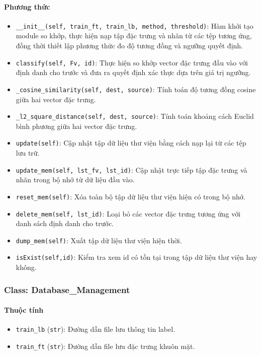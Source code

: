 \paragraph{Phương thức}
\begin{itemize}
    \item \texttt{\_\_init\_\_(self, train\_ft, train\_lb, method, threshold)}: Hàm khởi tạo module so khớp, thực hiện nạp tập đặc trưng và nhãn từ các tệp tương ứng, đồng thời thiết lập phương thức đo độ tương đồng và ngưỡng quyết định.
    \item \texttt{classify(self, Fv, id)}: Thực hiện so khớp vector đặc trưng đầu vào với định danh cho trước và đưa ra quyết định xác thực dựa trên giá trị ngưỡng.
    
    \item \texttt{\_cosine\_similarity(self, dest, source)}: Tính toán độ tương đồng cosine giữa hai vector đặc trưng.
    
    \item \texttt{\_l2\_square\_distance(self, dest, source)}: Tính toán khoảng cách Euclid bình phương giữa hai vector đặc trưng.
    
    \item \texttt{update(self)}: Cập nhật tập dữ liệu thư viện bằng cách nạp lại từ các tệp lưu trữ.
    
    \item \texttt{update\_mem(self, lst\_fv, lst\_id)}: Cập nhật trực tiếp tập đặc trưng và nhãn trong bộ nhớ từ dữ liệu đầu vào.
    
    \item \texttt{reset\_mem(self)}: Xóa toàn bộ tập dữ liệu thư viện hiện có trong bộ nhớ.
    
    \item \texttt{delete\_mem(self, lst\_id)}: Loại bỏ các vector đặc trưng tương ứng với danh sách định danh cho trước.
    
    \item \texttt{dump\_mem(self)}: Xuất tập dữ liệu thư viện hiện thời.
    \item \texttt{isExist(self,id)}: Kiểm tra xem id có tồn tại trong tập dữ liệu thư viện hay không.
\end{itemize}

\subsubsection{Class: Database\_Management}
\paragraph{Thuộc tính}
\begin{itemize}
    \item \texttt{train\_lb} (\texttt{str}): Đường dẫn file lưu thông tin label.
    \item \texttt{train\_ft} (\texttt{str}): Đường dẫn file lưu đặc trưng khuôn mặt.
\end{itemize}
